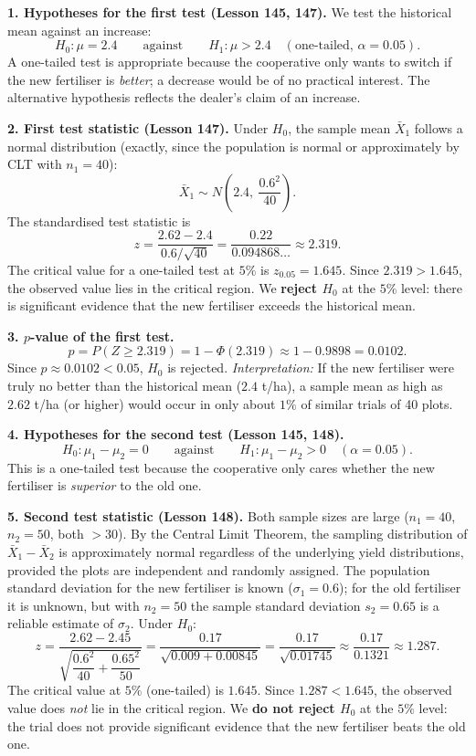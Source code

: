 \documentclass[11pt]{article}
\newcounter{popsec}
\newcounter{popsub}
\newcommand{\courssub}[1]{%
  \stepcounter{popsub}%
  \par\vspace{9pt}\noindent{\popxbold\fontsize{11.5}{13}\selectfont\color{popink}{\color{poporange}\thepopsec.\thepopsub}\hspace{6pt}#1}\par\nopagebreak\vspace{4pt}
}
\begin{document}
\courssub{Model Answers and Explanations}

\textbf{1. Hypotheses for the first test (Lesson 145, 147).} We test the historical mean against an increase:
\[ H_0 : \mu = 2.4 \qquad \text{against} \qquad H_1 : \mu > 2.4 \quad (\text{one-tailed, } \alpha = 0.05). \]
A one-tailed test is appropriate because the cooperative only wants to switch if the new fertiliser is \emph{better}; a decrease would be of no practical interest. The alternative hypothesis reflects the dealer's claim of an increase.

\textbf{2. First test statistic (Lesson 147).} Under $H_0$, the sample mean $\bar{X}_1$ follows a normal distribution (exactly, since the population is normal or approximately by CLT with $n_1=40$):
\[ \bar{X}_1 \sim N\!\left(2.4,\ \frac{0.6^2}{40}\right). \]
The standardised test statistic is
\[ z = \frac{2.62 - 2.4}{0.6/\sqrt{40}} = \frac{0.22}{0.094868\ldots} \approx 2.319. \]
The critical value for a one-tailed test at $5\%$ is $z_{0.05} = 1.645$. Since $2.319 > 1.645$, the observed value lies in the critical region. We \textbf{reject $H_0$} at the $5\%$ level: there is significant evidence that the new fertiliser exceeds the historical mean.

\textbf{3. $p$-value of the first test.}
\[ p = P(Z \geq 2.319) = 1 - \Phi(2.319) \approx 1 - 0.9898 = 0.0102. \]
Since $p \approx 0.0102 < 0.05$, $H_0$ is rejected. \emph{Interpretation:} If the new fertiliser were truly no better than the historical mean ($2.4$ t/ha), a sample mean as high as $2.62$ t/ha (or higher) would occur in only about $1\%$ of similar trials of 40 plots.

\textbf{4. Hypotheses for the second test (Lesson 145, 148).}
\[ H_0 : \mu_1 - \mu_2 = 0 \qquad \text{against} \qquad H_1 : \mu_1 - \mu_2 > 0 \quad (\alpha = 0.05). \]
This is a one-tailed test because the cooperative only cares whether the new fertiliser is \emph{superior} to the old one.

\textbf{5. Second test statistic (Lesson 148).} Both sample sizes are large ($n_1=40$, $n_2=50$, both $>30$). By the Central Limit Theorem, the sampling distribution of $\bar{X}_1 - \bar{X}_2$ is approximately normal regardless of the underlying yield distributions, provided the plots are independent and randomly assigned. The population standard deviation for the new fertiliser is known ($\sigma_1 = 0.6$); for the old fertiliser it is unknown, but with $n_2=50$ the sample standard deviation $s_2 = 0.65$ is a reliable estimate of $\sigma_2$. Under $H_0$:
\[ z = \frac{2.62 - 2.45}{\sqrt{\dfrac{0.6^2}{40} + \dfrac{0.65^2}{50}}}
= \frac{0.17}{\sqrt{0.009 + 0.00845}}
= \frac{0.17}{\sqrt{0.01745}}
\approx \frac{0.17}{0.1321}
\approx 1.287. \]
The critical value at $5\%$ (one-tailed) is $1.645$. Since $1.287 < 1.645$, the observed value does \emph{not} lie in the critical region. We \textbf{do not reject $H_0$} at the $5\%$ level: the trial does not provide significant evidence that the new fertiliser beats the old one.
\end{document}
